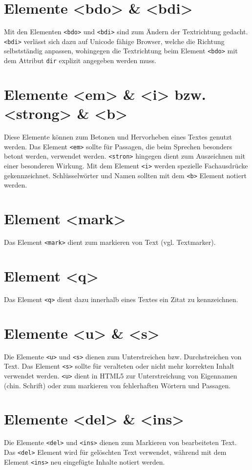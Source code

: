 \section{Elemente <bdo> \& <bdi>}
Mit den Elementen \texttt{<bdo>} und \texttt{<bdi>} sind zum Ändern der Textrichtung gedacht. \texttt{<bdi>} verlässt sich dazu auf Unicode fähige Browser, welche die Richtung selbstständig anpassen, wohingegen die Textrichtung beim Element \texttt{<bdo>} mit dem Attribut \texttt{dir} explizit angegeben werden muss.
\section{Elemente <em> \& <i> bzw. <strong> \& <b>}
Diese Elemente können zum Betonen und Hervorheben eines Textes genutzt werden. Das Element \texttt{<em>} sollte für Passagen, die beim Sprechen besonders betont werden, verwendet werden. \texttt{<stron>} hingegen dient zum Auszeichnen mit einer besonderen Wirkung. Mit dem Element \texttt{<i>} werden spezielle Fachausdrücke gekennzeichnet. Schlüsselwörter und Namen sollten mit dem \texttt{<b>} Element notiert werden.
\section{Element <mark>}
Das Element \texttt{<mark>} dient zum markieren von Text (vgl. Textmarker).
\section{Element <q>}
Das Element \texttt{<q>} dient dazu innerhalb eines Textes ein Zitat zu kennzeichnen.
\section{Elemente <u> \& <s>}
Die Elemente \texttt{<u>} und \texttt{<s>} dienen zum Unterstreichen bzw. Durchstreichen von Text. Das Element \texttt{<s>} sollte für veralteten oder nicht mehr korrekten Inhalt verwendet werden. \texttt{<u>} dient in HTML5 zur Unterstreichung von Eigennamen (chin. Schrift) oder zum markieren von fehlerhaften Wörtern und Passagen.
\section{Elemente <del> \& <ins>}
Die Elemente \texttt{<del>} und \texttt{<ins>} dienen zum Markieren von bearbeiteten Text. Das \texttt{<del>} Element wird für gelöschten Text verwendet, während mit dem Element \texttt{<ins>} neu eingefügte Inhalte notiert werden.
